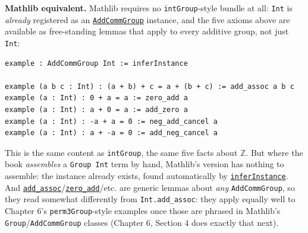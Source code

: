 \textbf{Mathlib equivalent.} Mathlib requires no \texttt{intGroup}-style bundle at all: \texttt{Int} is \emph{already} registered as an \href{https://loogle.lean-lang.org/?q=AddCommGroup}{\texttt{AddCommGroup}} instance, and the five axioms above are available as free-standing lemmas that apply to every additive group, not just \texttt{Int}:

\begin{lstlisting}
example : AddCommGroup Int := inferInstance

example (a b c : Int) : (a + b) + c = a + (b + c) := add_assoc a b c
example (a : Int) : 0 + a = a := zero_add a
example (a : Int) : a + 0 = a := add_zero a
example (a : Int) : -a + a = 0 := neg_add_cancel a
example (a : Int) : a + -a = 0 := add_neg_cancel a
\end{lstlisting}

This is the same content as \texttt{intGroup}, the same five facts about \(\mathbb{Z}\). But where the book \emph{assembles} a \texttt{Group Int} term by hand, Mathlib's version has nothing to assemble: the instance already exists, found automatically by \href{https://loogle.lean-lang.org/?q=inferInstance}{\texttt{inferInstance}}. And \href{https://loogle.lean-lang.org/?q=add_assoc}{\texttt{add\_\allowbreak{}assoc}}/\href{https://loogle.lean-lang.org/?q=zero_add}{\texttt{zero\_\allowbreak{}add}}/etc. are generic lemmas about \emph{any} \texttt{AddCommGroup}, so they read somewhat differently from \texttt{Int.add\_\allowbreak{}assoc}: they apply equally well to Chapter 6's \texttt{perm3Group}-style examples once those are phrased in Mathlib's \texttt{Group}/\texttt{AddCommGroup} classes (Chapter 6, Section 4 does exactly that next).
